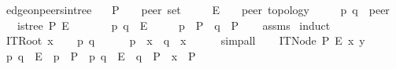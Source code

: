\begin{isabellebody}
\isanewline
{}\isamarkupfalse%
\ edge{\isacharunderscore}{\kern0pt}on{\isacharunderscore}{\kern0pt}peers{\isacharunderscore}{\kern0pt}in{\isacharunderscore}{\kern0pt}tree{\isacharcolon}{\kern0pt}\isanewline
\ \ \ P\ \ \ {\isacharcolon}{\kern0pt}{\isacharcolon}{\kern0pt}\ {\isachardoublequoteopen}{\isacharprime}{\kern0pt}peer\ set{\isachardoublequoteclose}\isanewline
\ \ \ \ \ E\ \ \ {\isacharcolon}{\kern0pt}{\isacharcolon}{\kern0pt}\ {\isachardoublequoteopen}{\isacharprime}{\kern0pt}peer\ topology{\isachardoublequoteclose}\isanewline
\ \ \ \ \ p\ q\ {\isacharcolon}{\kern0pt}{\isacharcolon}{\kern0pt}\ {\isachardoublequoteopen}{\isacharprime}{\kern0pt}peer{\isachardoublequoteclose}\isanewline
\ \ \ {\isachardoublequoteopen}is{\isacharunderscore}{\kern0pt}tree\ P\ E{\isachardoublequoteclose}\isanewline
\ \ \ \ \ \ \ {\isachardoublequoteopen}{\isacharparenleft}{\kern0pt}p{\isacharcomma}{\kern0pt}\ q{\isacharparenright}{\kern0pt}\ {\isasymin}\ E{\isachardoublequoteclose}\isanewline
\ \ \ \ \ {\isachardoublequoteopen}p\ {\isasymin}\ P{\isachardoublequoteclose}\ \ {\isachardoublequoteopen}q\ {\isasymin}\ P{\isachardoublequoteclose}\isanewline
%
\isadelimproof
\ \ %
\endisadelimproof
%
\isatagproof
{}\isamarkupfalse%
\ assms\isanewline
{}\isamarkupfalse%
\ induct\isanewline
\ \ \isamarkupfalse%
\ {\isacharparenleft}{\kern0pt}ITRoot\ x{\isacharparenright}{\kern0pt}\isanewline
\ \ \isamarkupfalse%
\ {\isachardoublequoteopen}{\isacharparenleft}{\kern0pt}p{\isacharcomma}{\kern0pt}\ q{\isacharparenright}{\kern0pt}\ {\isasymin}\ {\isacharbraceleft}{\kern0pt}{\isacharbraceright}{\kern0pt}{\isachardoublequoteclose}\isanewline
\ \ \isamarkupfalse%
\ {\isachardoublequoteopen}p\ {\isasymin}\ {\isacharbraceleft}{\kern0pt}x{\isacharbraceright}{\kern0pt}{\isachardoublequoteclose}\ \ {\isachardoublequoteopen}q\ {\isasymin}\ {\isacharbraceleft}{\kern0pt}x{\isacharbraceright}{\kern0pt}{\isachardoublequoteclose}\isanewline
\ \ \ \ \isamarkupfalse%
\ simp{\isacharunderscore}{\kern0pt}all\isanewline
{}\isamarkupfalse%
\isanewline
\ \ \isamarkupfalse%
\ {\isacharparenleft}{\kern0pt}ITNode\ P\ E\ x\ y{\isacharparenright}{\kern0pt}\isanewline
\ \ \isamarkupfalse%
\ {\isachardoublequoteopen}{\isacharparenleft}{\kern0pt}p{\isacharcomma}{\kern0pt}\ q{\isacharparenright}{\kern0pt}\ {\isasymin}\ E\ {\isasymLongrightarrow}\ p\ {\isasymin}\ P{\isachardoublequoteclose}\ \ {\isachardoublequoteopen}{\isacharparenleft}{\kern0pt}p{\isacharcomma}{\kern0pt}\ q{\isacharparenright}{\kern0pt}\ {\isasymin}\ E\ {\isasymLongrightarrow}\ q\ {\isasymin}\ P{\isachardoublequoteclose}\ \ {\isachardoublequoteopen}x\ {\isasymin}\ P{\isachardoublequoteclose}\isanewline

\end{isabellebody}
